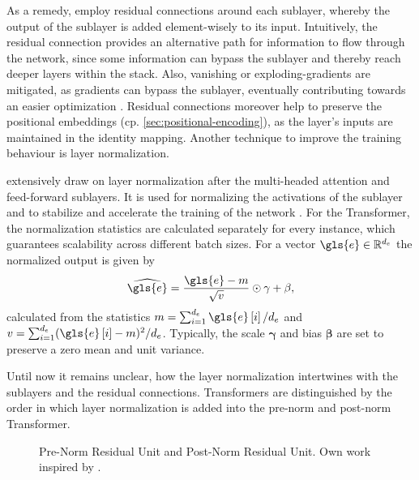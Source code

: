 As a remedy, \textcite[][3]{vaswaniAttentionAllYou2017} employ residual connections around each sublayer, whereby the output of the sublayer is added element-wisely to its input. Intuitively, the residual connection provides an alternative path for information to flow through the network, since some information can bypass the sublayer and thereby reach deeper layers within the stack. Also, vanishing or \glspl{exploding-gradient} are mitigated, as gradients can bypass the sublayer, eventually contributing towards an easier optimization \autocite[][3591]{liuRethinkingSkipConnection2020}. Residual connections moreover help to preserve the positional embeddings (cp. \cref{sec:positional-encoding}), as the layer's inputs are maintained in the identity mapping. Another technique to improve the training behaviour is layer normalization.

\textcite[][3]{vaswaniAttentionAllYou2017} extensively draw on layer normalization \autocite[][4]{baLayerNormalization2016} after the multi-headed attention and feed-forward sublayers. It is used for normalizing the activations of the sublayer and to stabilize and accelerate the training of the network \autocite[][2]{baLayerNormalization2016}. For the Transformer, the normalization statistics are calculated separately for every instance, which guarantees scalability across different batch sizes. For a vector $\gls{e}\in \mathbb{R}^{d_e}$ the normalized output is given by
\begin{equation}
    \widehat{\gls{e}}=\frac{\gls{e}-m}{\sqrt{v}} \odot \mathbf{\gamma}+\mathbf{\beta},
\end{equation}
calculated from the statistics $m = \sum_{i=1}^{d_{e}} \gls{e}\left[i\right] / d_{e}$ and $v = \sum_{i=1}^{d_{e}}(\gls{e}\left[i\right]-m)^2 / d_{e}$. Typically, the scale $\mathbf{\gamma}$ and bias $\mathbf{\beta}$ are set to preserve a zero mean and unit variance.

Until now it remains unclear, how the layer normalization intertwines with the sublayers and the residual connections. Transformers are distinguished by the order in which layer normalization is added into the pre-norm and post-norm Transformer.
\begin{figure}[ht]
    \hfill
    \hfill
    \hfill\null
    \caption[Pre-Norm Residual Unit and Post-Norm Residual Unit]{Pre-Norm Residual Unit and Post-Norm Residual Unit. Own work inspired by \textcite[][2]{wangLearningDeepTransformer2019}.}
    \label{fig:norm-residual}
\end{figure}

